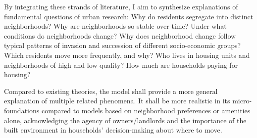 By integrating these strands of literature, I aim to synthesize explanations of fundamental questions of urban research: Why do residents segregate into distinct neighborhoods? Why are neighborhoods so stable over time? Under what conditions do neighborhoods change? Why does neighborhood change follow typical patterns of invasion and succession of different socio-economic groups? Which residents move more frequently, and why? Who lives in housing units and neighborhoods of high and low quality? How much are households paying for housing?

Compared to existing theories, the model shall provide a more general explanation of multiple related phenomena. It shall be more realistic in its micro-foundations compared to models based on neighborhood preferences or amenities alone, acknowledging the agency of owners/landlords and the importance of the built environment in households' decision-making about where to move.